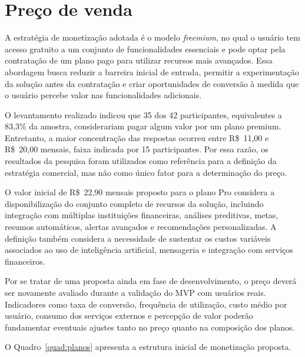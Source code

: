 \section{Preço de venda}\label{sec:preco}

A estratégia de monetização adotada é o modelo \textit{freemium}, no qual o usuário tem acesso gratuito a um conjunto de funcionalidades essenciais e pode optar pela contratação de um plano pago para utilizar recursos mais avançados. Essa abordagem busca reduzir a barreira inicial de entrada, permitir a experimentação da solução antes da contratação e criar oportunidades de conversão à medida que o usuário percebe valor nas funcionalidades adicionais.

O levantamento realizado indicou que 35 dos 42 participantes, equivalentes a 83,3\% da amostra, considerariam pagar algum valor por um plano premium. Entretanto, a maior concentração das respostas ocorreu entre R\$~11,00 e R\$~20,00 mensais, faixa indicada por 15 participantes. Por essa razão, os resultados da pesquisa foram utilizados como referência para a definição da estratégia comercial, mas não como único fator para a determinação do preço.

O valor inicial de R\$~22,90 mensais proposto para o plano Pro considera a disponibilização do conjunto completo de recursos da solução, incluindo integração com múltiplas instituições financeiras, análises preditivas, metas, resumos automáticos, alertas avançados e recomendações personalizadas. A definição também considera a necessidade de sustentar os custos variáveis associados ao uso de inteligência artificial, mensageria e integração com serviços financeiros.

Por se tratar de uma proposta ainda em fase de desenvolvimento, o preço deverá ser novamente avaliado durante a validação do MVP com usuários reais. Indicadores como taxa de conversão, frequência de utilização, custo médio por usuário, consumo dos serviços externos e percepção de valor poderão fundamentar eventuais ajustes tanto no preço quanto na composição dos planos.

O Quadro~\ref{quad:planos} apresenta a estrutura inicial de monetização proposta.

